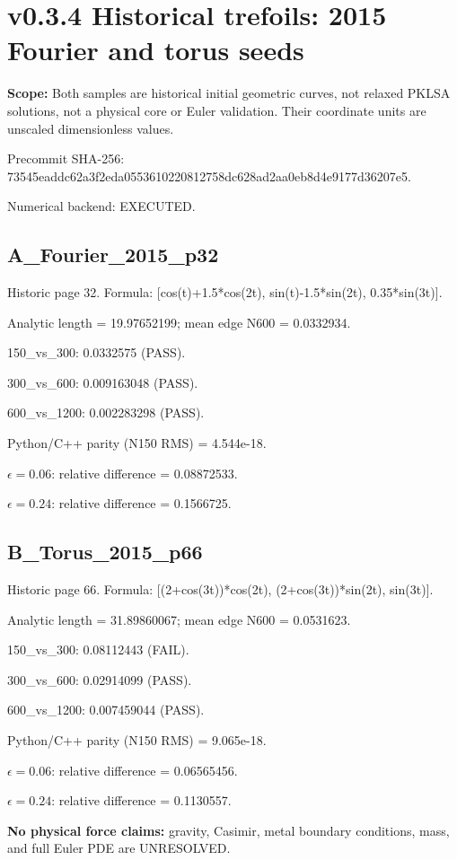 \documentclass[10pt,a4paper]{article}
\begin{document}
\section{v0.3.4 Historical trefoils: 2015 Fourier and torus seeds}\textbf{Scope:} Both samples are historical initial geometric curves, not relaxed PKLSA solutions, not a physical core or Euler validation. Their coordinate units are unscaled dimensionless values. \par Precommit SHA-256: 73545eaddc62a3f2eda0553610220812758dc628ad2aa0eb8d4e9177d36207e5. \par Numerical backend: EXECUTED.\subsection{A\_Fourier\_2015\_p32}Historic page 32. Formula: [cos(t)+1.5*cos(2t), sin(t)-1.5*sin(2t), 0.35*sin(3t)].\par Analytic length = 19.97652199; mean edge N600 = 0.0332934. \par 150\_vs\_300: 0.0332575 (PASS). \par 300\_vs\_600: 0.009163048 (PASS). \par 600\_vs\_1200: 0.002283298 (PASS). \par Python/C++ parity (N150 RMS) = 4.544e-18. \par $\epsilon=0.06$: relative difference = 0.08872533. \par $\epsilon=0.24$: relative difference = 0.1566725. \subsection{B\_Torus\_2015\_p66}Historic page 66. Formula: [(2+cos(3t))*cos(2t), (2+cos(3t))*sin(2t), sin(3t)].\par Analytic length = 31.89860067; mean edge N600 = 0.0531623. \par 150\_vs\_300: 0.08112443 (FAIL). \par 300\_vs\_600: 0.02914099 (PASS). \par 600\_vs\_1200: 0.007459044 (PASS). \par Python/C++ parity (N150 RMS) = 9.065e-18. \par $\epsilon=0.06$: relative difference = 0.06565456. \par $\epsilon=0.24$: relative difference = 0.1130557. \par\textbf{No physical force claims:} gravity, Casimir, metal boundary conditions, mass, and full Euler PDE are UNRESOLVED.
\end{document}
